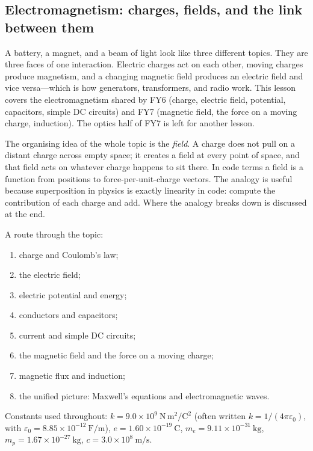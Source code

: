 
\subsection{Electromagnetism: charges, fields, and the link between them}

A battery, a magnet, and a beam of light look like three different topics. They are three faces of one interaction. Electric charges act on each other, moving charges produce magnetism, and a changing magnetic field produces an electric field and vice versa---which is how generators, transformers, and radio work. This lesson covers the electromagnetism shared by FY6 (charge, electric field, potential, capacitors, simple DC circuits) and FY7 (magnetic field, the force on a moving charge, induction). The optics half of FY7 is left for another lesson.

The organising idea of the whole topic is the \emph{field}. A charge does not pull on a distant charge across empty space; it creates a field at every point of space, and that field acts on whatever charge happens to sit there. In code terms a field is a function from positions to force-per-unit-charge vectors. The analogy is useful because superposition in physics is exactly linearity in code: compute the contribution of each charge and add. Where the analogy breaks down is discussed at the end.

A route through the topic:
\begin{enumerate}[label=\arabic*.]
  \item charge and Coulomb's law;
  \item the electric field;
  \item electric potential and energy;
  \item conductors and capacitors;
  \item current and simple DC circuits;
  \item the magnetic field and the force on a moving charge;
  \item magnetic flux and induction;
  \item the unified picture: Maxwell's equations and electromagnetic waves.
\end{enumerate}

Constants used throughout:
$k = 9.0\times 10^{9}\ \mathrm{N\,m^2/C^2}$ (often written $k = 1/(4\pi\varepsilon_0)$, with $\varepsilon_0 = 8.85\times 10^{-12}\ \mathrm{F/m}$),
$e = 1.60\times 10^{-19}\ \mathrm{C}$,
$m_e = 9.11\times 10^{-31}\ \mathrm{kg}$,
$m_p = 1.67\times 10^{-27}\ \mathrm{kg}$,
$c = 3.0\times 10^{8}\ \mathrm{m/s}$.

